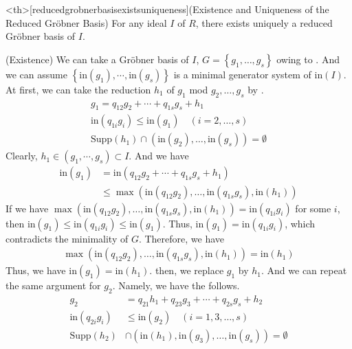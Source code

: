 \documentclass{article}
\begin{document}
\begin{statementsp}<th>[reducedgrobnerbasisexistsuniqueness](Existence and Uniqueness of the Reduced Gr\"{o}bner Basis)
    For any ideal $I$ of $R$, there exists uniquely a reduced Gr\"{o}bner basis of $I$.
\end{statementsp}
\begin{pfsp}
    (Existence) We can take a Gr\"{o}bner basis of $I$, $G = \left\{ g_1, \ldots, g_s \right\}$ owing to . And we can assume $\left\{ \mathrm{in}(g_1), \cdots, \mathrm{in}(g_s) \right\}$ is a minimal generator system of $\mathrm{in}(I)$.\\
    At first, we can take the reduction $h_1$ of $g_1$ mod $g_2, \ldots, g_s$ by .
    \begin{align}
        g_1 = q_{12} g_2 + \cdots + q_{1s} g_s + h_1\\ 
        \mathrm{in}(q_{1i} g_i) \leq \mathrm{in}(g_1) \quad (i=2, \ldots, s)\\ 
        \mathrm{Supp}(h_1) \cap (\mathrm{in}(g_2), \ldots, \mathrm{in}(g_s)) = \emptyset
    \end{align}
    Clearly, $h_1 \in (g_1, \cdots, g_s) \subset I$. And we have
    \begin{align}
        \mathrm{in}(g_1) &= \mathrm{in}(q_{12}g_2 + \cdots + q_{1s} g_s + h_1) \\
        &\leq \max(\mathrm{in}(q_{12} g_2), \ldots, \mathrm{in}(q_{1s} g_s), \mathrm{in}(h_1))
    \end{align}
    If we have $\max(\mathrm{in}(q_{12} g_2), \ldots, \mathrm{in}(q_{1s} g_s), \mathrm{in}(h_1)) = \mathrm{in}(q_{1i}g_i)$ for some $i$, then $\mathrm{in}(g_1) \leq \mathrm{in}(q_{1i} g_i) \leq \mathrm{in}(g_1)$. Thus, $\mathrm{in}(g_1) = \mathrm{in}(q_{1i} g_i)$, which contradicts the minimality of $G$. Therefore, we have
    \begin{align}
        \max(\mathrm{in}(q_{12} g_2), \ldots, \mathrm{in}(q_{1s} g_s), \mathrm{in}(h_1)) = \mathrm{in}(h_1)
    \end{align}
    Thus, we have $\mathrm{in}(g_1) = \mathrm{in}(h_1)$. then, we replace $g_1$ by $h_1$. And we can repeat the same argument for $g_2$. Namely, we have the follows.
    \begin{align}
        g_2 &= q_{21} h_1 + q_{23} g_3 + \cdots + q_{2s} g_s + h_2\\ 
        \mathrm{in}(q_{2i} g_i) &\leq \mathrm{in}(g_2) \quad (i=1,3,\ldots,s)\\ 
        \mathrm{Supp}(h_2) &\cap (\mathrm{in}(h_1), \mathrm{in}(g_3), \ldots, \mathrm{in}(g_s)) = \emptyset

\end{align}
\end{pfsp}
\end{document}
